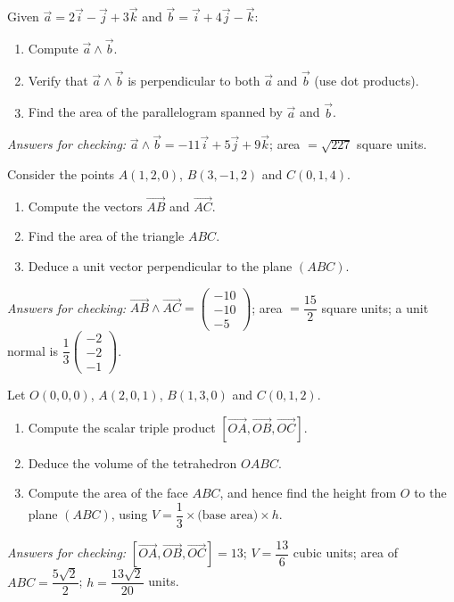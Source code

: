 \documentclass[11pt]{article}
\newcounter{popsec}
\newcounter{popsub}
\newcommand{\courssub}[1]{%
  \stepcounter{popsub}%
  \par\vspace{9pt}\noindent{\popxbold\fontsize{11.5}{13}\selectfont\color{popink}{\color{poporange}\thepopsec.\thepopsub}\hspace{6pt}#1}\par\nopagebreak\vspace{4pt}
}
\begin{document}
\courssub{I practise}

\begin{exercice}
Given $\vec{a} = 2\vec{i} - \vec{j} + 3\vec{k}$ and $\vec{b} = \vec{i} + 4\vec{j} - \vec{k}$:
\begin{enumerate}
\item Compute $\vec{a} \wedge \vec{b}$.
\item Verify that $\vec{a} \wedge \vec{b}$ is perpendicular to both $\vec{a}$ and $\vec{b}$ (use dot products).
\item Find the area of the parallelogram spanned by $\vec{a}$ and $\vec{b}$.
\end{enumerate}
\emph{Answers for checking:} $\vec{a} \wedge \vec{b} = -11\vec{i} + 5\vec{j} + 9\vec{k}$; area $= \sqrt{227}$ square units.
\end{exercice}

\begin{exercice}
Consider the points $A(1, 2, 0)$, $B(3, -1, 2)$ and $C(0, 1, 4)$.
\begin{enumerate}
\item Compute the vectors $\vec{AB}$ and $\vec{AC}$.
\item Find the area of the triangle $ABC$.
\item Deduce a unit vector perpendicular to the plane $(ABC)$.
\end{enumerate}
\emph{Answers for checking:} $\vec{AB} \wedge \vec{AC} = \begin{pmatrix} -10 \\ -10 \\ -5 \end{pmatrix}$; area $= \dfrac{15}{2}$ square units; a unit normal is $\dfrac{1}{3}\begin{pmatrix} -2 \\ -2 \\ -1 \end{pmatrix}$.
\end{exercice}

\begin{exercice}
Let $O(0, 0, 0)$, $A(2, 0, 1)$, $B(1, 3, 0)$ and $C(0, 1, 2)$.
\begin{enumerate}
\item Compute the scalar triple product $[\vec{OA}, \vec{OB}, \vec{OC}]$.
\item Deduce the volume of the tetrahedron $OABC$.
\item Compute the area of the face $ABC$, and hence find the height from $O$ to the plane $(ABC)$, using $V = \dfrac{1}{3} \times \text{(base area)} \times h$.
\end{enumerate}
\emph{Answers for checking:} $[\vec{OA}, \vec{OB}, \vec{OC}] = 13$; $V = \dfrac{13}{6}$ cubic units; area of $ABC = \dfrac{5\sqrt{2}}{2}$; $h = \dfrac{13\sqrt{2}}{20}$ units.
\end{exercice}
\end{document}
